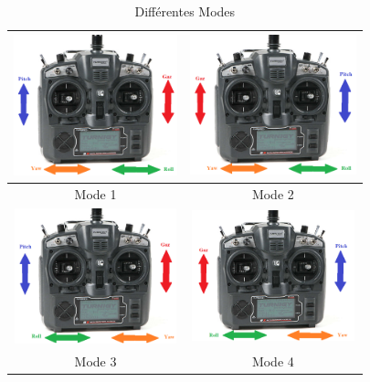 	\begin{table}[h]
		\begin{center}
			
			\caption{Différentes Modes }
			\begin{tabular}{|c|c|}
				\hline
				
				\centering
				
				\includegraphics[width=4.74cm]{Images/Mode 1(Radiocommande)} & \includegraphics[width=4.8cm]{Images/Mode 2(Radiocommande)}\\
				\hline
				\centering
				
				Mode 1 & Mode 2 \\
				
				\hline
				\centering
				\includegraphics[width=4.69999cm]{Images/Mode 3(Radiocommande)}& \includegraphics[width=4.69999cm]{Images/Mode 4(Radiocommande)}\\
				\hline
				\centering
				
				Mode 3 &  Mode 4 \\
				\hline
			\end{tabular}
		\end{center}
	\end{table}
	
